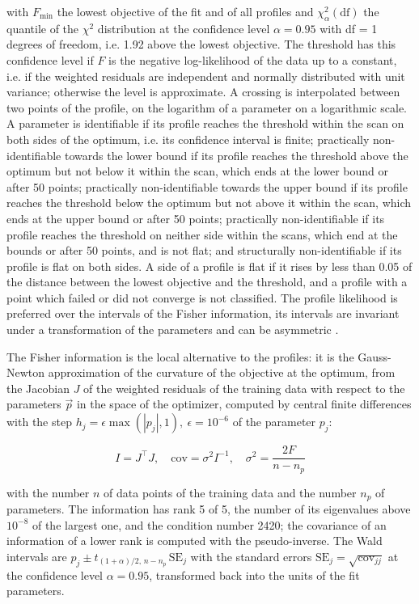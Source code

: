 with $F_{\min}$ the lowest objective of the fit and of all profiles and $\chi^2_{\alpha}(\mathrm{df})$ the quantile of the $\chi^2$ distribution at the confidence level $\alpha = 0.95$ with df = 1 degrees of freedom, i.e. 1.92 above the lowest objective. The threshold has this confidence level if $F$ is the negative log-likelihood of the data up to a constant, i.e. if the weighted residuals are independent and normally distributed with unit variance; otherwise the level is approximate. A crossing is interpolated between two points of the profile, on the logarithm of a parameter on a logarithmic scale. A parameter is identifiable if its profile reaches the threshold within the scan on both sides of the optimum, i.e. its confidence interval is finite; practically non-identifiable towards the lower bound if its profile reaches the threshold above the optimum but not below it within the scan, which ends at the lower bound or after 50 points; practically non-identifiable towards the upper bound if its profile reaches the threshold below the optimum but not above it within the scan, which ends at the upper bound or after 50 points; practically non-identifiable if its profile reaches the threshold on neither side within the scans, which end at the bounds or after 50 points, and is not flat; and structurally non-identifiable if its profile is flat on both sides. A side of a profile is flat if it rises by less than 0.05 of the distance between the lowest objective and the threshold, and a profile with a point which failed or did not converge is not classified. The profile likelihood is preferred over the intervals of the Fisher information, its intervals are invariant under a transformation of the parameters and can be asymmetric \cite{Wieland2021}.

The Fisher information is the local alternative to the profiles: it is the Gauss-Newton approximation of the curvature of the objective at the optimum, from the Jacobian $J$ of the weighted residuals of the training data with respect to the parameters $\vec{p}$ in the space of the optimizer, computed by central finite differences with the step $h_j = \epsilon \max(|p_j|, 1),\ \epsilon = 10^{-6}$ of the parameter $p_j$:

\begin{equation}
I = J^\top J, \quad \mathrm{cov} = \sigma^2 I^{-1}, \quad \sigma^2 = \frac{2 F}{n - n_p}
\end{equation}

with the number $n$ of data points of the training data and the number $n_p$ of parameters. The information has rank 5 of 5, the number of its eigenvalues above $10^{-8}$ of the largest one, and the condition number 2420; the covariance of an information of a lower rank is computed with the pseudo-inverse. The Wald intervals are $\hat{p}_j \pm t_{(1+\alpha)/2,\, n-n_p}\, \mathrm{SE}_j$ with the standard errors $\mathrm{SE}_j = \sqrt{\mathrm{cov}_{jj}}$ at the confidence level $\alpha = 0.95$, transformed back into the units of the fit parameters.


